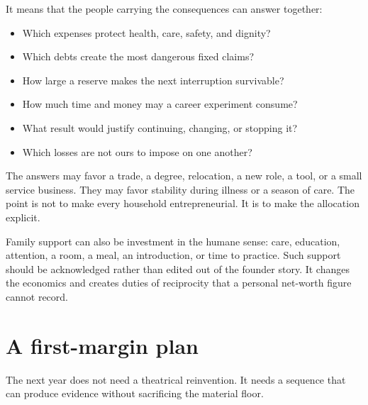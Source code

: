 It means that the people carrying the consequences can answer together:

\begin{itemize}
\item Which expenses protect health, care, safety, and dignity?
\item Which debts create the most dangerous fixed claims?
\item How large a reserve makes the next interruption survivable?
\item How much time and money may a career experiment consume?
\item What result would justify continuing, changing, or stopping it?
\item Which losses are not ours to impose on one another?
\end{itemize}

The answers may favor a trade, a degree, relocation, a new role, a tool, or a
small service business. They may favor stability during illness or a season of
care. The point is not to make every household entrepreneurial. It is to make
the allocation explicit.

Family support can also be investment in the humane sense: care, education,
attention, a room, a meal, an introduction, or time to practice. Such support
should be acknowledged rather than edited out of the founder story. It changes
the economics and creates duties of reciprocity that a personal net-worth
figure cannot record.

\enlargethispage{3\baselineskip}
\section{A first-margin plan}

The next year does not need a theatrical reinvention. It needs a sequence that
can produce evidence without sacrificing the material floor.

